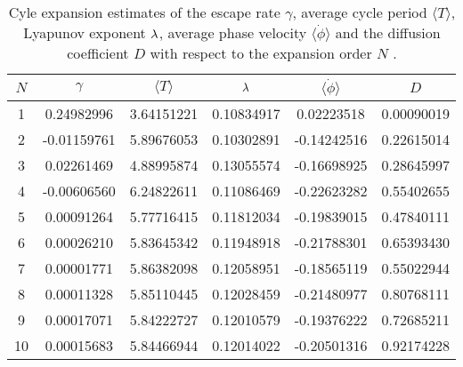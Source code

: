 \begin{table}
	\begin{tabular}{c|c|c|c|c|c}
	 $N$ & $\gamma$ & $\langle T \rangle$ & $\lambda$ & $\langle \dot{\phi} \rangle$ & $D$ \\
	\hline
	1 & 0.24982996 & 3.64151221 & 0.10834917 & 0.02223518 & 0.00090019 \\
 	2 & -0.01159761 & 5.89676053 & 0.10302891 & -0.14242516 & 0.22615014 \\
 	3 & 0.02261469 & 4.88995874 & 0.13055574 & -0.16698925 & 0.28645997 \\
 	4 & -0.00606560 & 6.24822611 & 0.11086469 & -0.22623282 & 0.55402655 \\
 	5 & 0.00091264 & 5.77716415 & 0.11812034 & -0.19839015 & 0.47840111 \\
 	6 & 0.00026210 & 5.83645342 & 0.11948918 & -0.21788301 & 0.65393430 \\
 	7 & 0.00001771 & 5.86382098 & 0.12058951 & -0.18565119 & 0.55022944 \\
 	8 & 0.00011328 & 5.85110445 & 0.12028459 & -0.21480977 & 0.80768111 \\
 	9 & 0.00017071 & 5.84222727 & 0.12010579 & -0.19376222 & 0.72685211 \\
 	10 & 0.00015683 & 5.84466944 & 0.12014022 & -0.20501316 & 0.92174228 \\
 	\end{tabular}
	\caption{Cyle expansion estimates of the escape rate $\gamma$, average cycle period $\langle T \rangle$, Lyapunov exponent $\lambda$, average phase velocity $\langle \dot{\phi} \rangle$ and the diffusion coefficient $D$ with respect to the expansion order $N$ .}
	\label{t-DynamicalAveragesNoGrammar}
\end{table}

